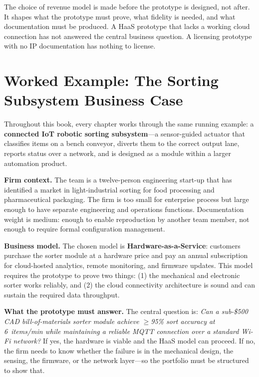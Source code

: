 The choice of revenue model is made before the prototype is designed,
not after.
It shapes what the prototype must prove, what fidelity is needed, and
what documentation must be produced.
A HaaS prototype that lacks a working cloud connection has not answered
the central business question.
A licensing prototype with no IP documentation has nothing to license.

\section*{Worked Example: The Sorting Subsystem Business Case}
\label{sec:ch1-worked-example}

Throughout this book, every chapter works through the same running
example: a \textbf{connected IoT robotic sorting subsystem}---a
sensor-guided actuator that classifies items on a bench conveyor,
diverts them to the correct output lane, reports status over a network,
and is designed as a module within a larger automation product.

\textbf{Firm context.}
The team is a twelve-person engineering start-up that has identified
a market in light-industrial sorting for food processing and
pharmaceutical packaging.
The firm is too small for enterprise process but large enough to have
separate engineering and operations functions.
Documentation weight is medium: enough to enable reproduction by
another team member, not enough to require formal configuration management.

\textbf{Business model.}
The chosen model is \textbf{Hardware-as-a-Service}: customers purchase
the sorter module at a hardware price and pay an annual subscription for
cloud-hosted analytics, remote monitoring, and firmware updates.
This model requires the prototype to prove two things: (1) the mechanical
and electronic sorter works reliably, and (2) the cloud connectivity
architecture is sound and can sustain the required data throughput.

\textbf{What the prototype must answer.}
The central question is: \emph{Can a sub-\$500 CAD bill-of-materials
sorter module achieve $\ge$95\% sort accuracy at 6~items/min while
maintaining a reliable MQTT connection over a standard Wi-Fi network?}
If yes, the hardware is viable and the HaaS model can proceed.
If no, the firm needs to know whether the failure is in the mechanical
design, the sensing, the firmware, or the network layer---so the
portfolio must be structured to show that.

